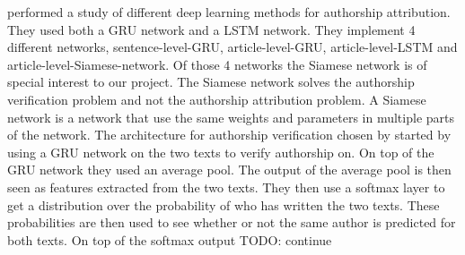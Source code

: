 \cite{qian:2018} performed a study of different deep learning methods for
authorship attribution. They used both a \gls{GRU} network and a \gls{LSTM}
network. They implement 4 different networks, sentence-level-\gls{GRU},
article-level-\gls{GRU}, article-level-\gls{LSTM} and
article-level-Siamese-network. Of those 4 networks the Siamese network is of
special interest to our project. The Siamese network solves the authorship
verification problem and not the authorship attribution problem. A Siamese
network is a network that use the same weights and parameters in multiple parts
of the network. The architecture for authorship verification chosen by
\cite{qian:2018} started by using a \gls{GRU} network on the two texts to verify
authorship on. On top of the \gls{GRU} network they used an average pool. The
output of the average pool is then seen as features extracted from the two
texts. They then use a softmax layer to get a distribution over the probability
of who has written the two texts. These probabilities are then used to see
whether or not the same author is predicted for both texts. On top of the
softmax output TODO: continue
